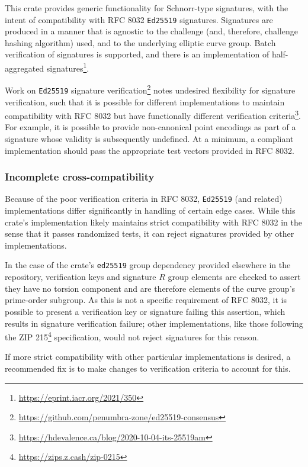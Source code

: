 \documentclass{article}
\begin{document}
This crate provides generic functionality for Schnorr-type signatures, with the intent of compatibility with RFC 8032 \texttt{Ed25519} signatures.
Signatures are produced in a manner that is agnostic to the challenge (and, therefore, challenge hashing algorithm) used, and to the underlying elliptic curve group.
Batch verification of signatures is supported, and there is an implementation of half-aggregated signatures\footnote{\url{https://eprint.iacr.org/2021/350}}.

Work on \texttt{Ed25519} signature verification\footnote{\url{https://github.com/penumbra-zone/ed25519-consensus}} notes undesired flexibility for signature verification, such that it is possible for different implementations to maintain compatibility with RFC 8032 but have functionally different verification criteria\footnote{\url{https://hdevalence.ca/blog/2020-10-04-its-25519am}}.
For example, it is possible to provide non-canonical point encodings as part of a signature whose validity is subsequently undefined.
At a minimum, a compliant implementation should pass the appropriate test vectors provided in RFC 8032.


\subsubsection{Incomplete cross-compatibility}

Because of the poor verification criteria in RFC 8032, \texttt{Ed25519} (and related) implementations differ significantly in handling of certain edge cases.
While this crate's implementation likely maintains strict compatibility with RFC 8032 in the sense that it passes randomized tests, it can reject signatures provided by other implementations.

In the case of the crate's \texttt{ed25519} group dependency provided elsewhere in the repository, verification keys and signature $R$ group elements are checked to assert they have no torsion component and are therefore elements of the curve group's prime-order subgroup.
As this is not a specific requirement of RFC 8032, it is possible to present a verification key or signature failing this assertion, which results in signature verification failure; other implementations, like those following the ZIP 215\footnote{\url{https://zips.z.cash/zip-0215}} specification, would not reject signatures for this reason.

If more strict compatibility with other particular implementations is desired, a recommended fix is to make changes to verification criteria to account for this.
\end{document}
